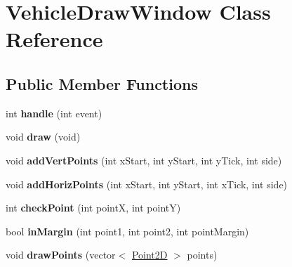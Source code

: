 \hypertarget{class_vehicle_draw_window}{
\section{VehicleDrawWindow Class Reference}
\label{class_vehicle_draw_window}
}
\subsection*{Public Member Functions}
\begin{DoxyCompactItemize}
\item 
\hypertarget{class_vehicle_draw_window_a16f362e2818e2221cf2b7ff5a7e5ddbc}{
int {\bfseries handle} (int event)}
\label{class_vehicle_draw_window_a16f362e2818e2221cf2b7ff5a7e5ddbc}

\item 
\hypertarget{class_vehicle_draw_window_a7f1d262d0069129e66c3d8e298338d6b}{
void {\bfseries draw} (void)}
\label{class_vehicle_draw_window_a7f1d262d0069129e66c3d8e298338d6b}

\item 
\hypertarget{class_vehicle_draw_window_ab86c94afd868ced54bf2f19144595167}{
void {\bfseries addVertPoints} (int xStart, int yStart, int yTick, int side)}
\label{class_vehicle_draw_window_ab86c94afd868ced54bf2f19144595167}

\item 
\hypertarget{class_vehicle_draw_window_a6a610ecca4517049cf1dde251e77b51d}{
void {\bfseries addHorizPoints} (int xStart, int yStart, int xTick, int side)}
\label{class_vehicle_draw_window_a6a610ecca4517049cf1dde251e77b51d}

\item 
\hypertarget{class_vehicle_draw_window_ab59fb4475a32d6eaf391661f2a1ad538}{
int {\bfseries checkPoint} (int pointX, int pointY)}
\label{class_vehicle_draw_window_ab59fb4475a32d6eaf391661f2a1ad538}

\item 
\hypertarget{class_vehicle_draw_window_a05ee2cbcfe49062f69133153792bda99}{
bool {\bfseries inMargin} (int point1, int point2, int pointMargin)}
\label{class_vehicle_draw_window_a05ee2cbcfe49062f69133153792bda99}

\item 
\hypertarget{class_vehicle_draw_window_a57ce251228aeccb7f57a9586232f59b1}{
void {\bfseries drawPoints} (vector$<$ \hyperlink{class_point2_d}{Point2D} $>$ points)}
\label{class_vehicle_draw_window_a57ce251228aeccb7f57a9586232f59b1}


\end{DoxyCompactItemize}
